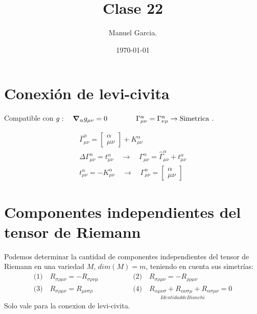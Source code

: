 \documentclass{article}
\title{Clase 22 }
\author{Manuel Garcia.}
\date{\today}
\begin{document}
\maketitle

\section{Conexión de levi-civita }
Compatible con $ g: \quad \grad _{\alpha } g _{\mu\nu} = 0 \qquad \qquad \Gamma _{\mu\nu} ^ {\alpha} = \Gamma _{\nu\mu} ^ {\alpha} \rightarrow \text{Simetrica } $.

\begin{gather*}
  \bar \Gamma _{\mu\nu} ^ {\alpha} = \begin{bmatrix}
      \alpha \\
      \mu\nu 
  \end{bmatrix} + K _{\mu\nu} ^ {\alpha}\\
  \Delta \Gamma _{\mu\nu} ^ {\alpha} = t _{\mu\nu} ^ {\alpha} \quad \rightarrow \quad \Gamma _{\mu\nu} ^ {\alpha} = \hat \Gamma _{\mu\nu} ^ {\alpha} + t _{\mu\nu} ^ {\alpha}\\
  t _{\mu\nu} ^ {\alpha} = -K ^ {\alpha} _{\mu\nu}  \quad \rightarrow \quad 
  \Gamma _{\mu\nu} ^ {\alpha} = \begin{bmatrix}
      \alpha \\
      \mu\nu 
  \end{bmatrix} 
\end{gather*}

\section{Componentes independientes del tensor de Riemann }
Podemos determinar la cantidad de componentes independientes del tensor de Riemann en una variedad $ M  $, $ dim(M )= m $, teniendo en cuenta sus simetrías: 
\begin{align*}
  \text{(1)}\quad R _{\sigma\rho\mu\nu} = - R _{\sigma\rho\nu\mu}  \qquad \qquad  &\text{(2)} \quad R _{\sigma\rho\mu\nu} = - R _{\rho\rho\mu\nu} \\
\text{(3)}\quad R _{\sigma\rho\mu\nu} =  R _{\mu\nu\sigma\rho}  \qquad \qquad  &\underset{Identidad de Bianchi }{\text{(4)} \quad R _{\alpha \mu\nu\sigma}  + R _{\alpha\nu\sigma\mu} + R _{\alpha\sigma\mu\nu} = 0 }
\end{align*}
Solo vale para la conexion de levi-civita.

\hfill 
\hfill 

\hfill 
\end{document}

